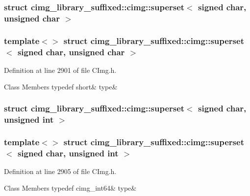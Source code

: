 \subsubsection{struct cimg\+\_\+library\+\_\+suffixed\+:\+:cimg\+:\+:superset$<$ signed char, unsigned char $>$}
\subsubsection*{template$<$$>$\newline
struct cimg\+\_\+library\+\_\+suffixed\+::cimg\+::superset$<$ signed char, unsigned char $>$}



Definition at line 2901 of file C\+Img.\+h.

\begin{DoxyFields}{Class Members}
\mbox{\label{namespacecimg__library__suffixed_1_1cimg_a24e1e6c704d626e2a0a35a18a91c0255}} 
typedef short&
type&
\\
\hline

\end{DoxyFields}
\label{structcimg__library__suffixed_1_1cimg_1_1superset_3_01signed_01char_00_01unsigned_01int_01_4}
\subsubsection{struct cimg\+\_\+library\+\_\+suffixed\+:\+:cimg\+:\+:superset$<$ signed char, unsigned int $>$}
\subsubsection*{template$<$$>$\newline
struct cimg\+\_\+library\+\_\+suffixed\+::cimg\+::superset$<$ signed char, unsigned int $>$}



Definition at line 2905 of file C\+Img.\+h.

\begin{DoxyFields}{Class Members}
\mbox{\label{namespacecimg__library__suffixed_1_1cimg_a4a16bfe2a0cff7a21c5d260b29d65945}} 
typedef cimg\_int64&
type&
\\
\hline

\end{DoxyFields}
\label{structcimg__library__suffixed_1_1cimg_1_1superset_3_01signed_01char_00_01unsigned_01short_01_4}
